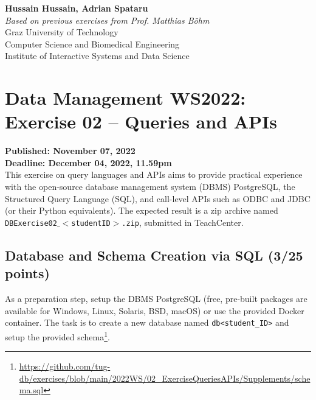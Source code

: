 \documentclass[
        a4paper,
        pdftex,
        english, 
        oneside,%
        listof=totoc,%
        bibliography=totoc, %
        titlepage,
        abstracton 
]{scrartcl} %
\begin{document}
	

\frenchspacing


\begin{flushleft}
\noindent \textbf{Hussain Hussain, Adrian Spataru}\\
\textit{Based on previous exercises from Prof. Matthias B\"ohm} \\
Graz University of Technology\\
Computer Science and Biomedical Engineering\\
Institute of Interactive Systems and Data Science\\
\end{flushleft}

\bigskip

\setcounter{section}{1}
\section{Data Management WS2022: Exercise 02 -- Queries and APIs}
\noindent \textbf{Published: November 07, 2022}\\
\noindent \textbf{Deadline: December 04, 2022, 11.59pm}\\

\noindent This exercise on query languages and APIs aims to provide practical experience with the open-source database management system (DBMS) PostgreSQL, the Structured Query Language (SQL), and call-level APIs such as ODBC and JDBC (or their Python equivalents). The expected result is a zip archive named \texttt{DBExercise02$\_<$studentID$>$.zip}, submitted in TeachCenter.

\subsection{Database and Schema Creation via SQL (3/25 points)}
\label{sec:SQL1}

As a preparation step, setup the DBMS PostgreSQL (free, pre-built packages are available for Windows, Linux, Solaris, BSD, macOS) or use the provided Docker container. The task is to create a new database named \texttt{db<student\_ID>} and setup the provided schema\footnote{\url{https://github.com/tug-db/exercises/blob/main/2022WS/02_ExerciseQueriesAPIs/Supplements/schema.sql}}. \\
\end{document}
